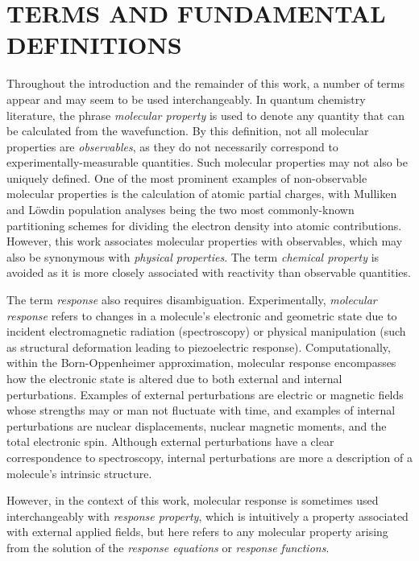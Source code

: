 \documentclass[%
class = book,%
crop = false,%
float = true,%
multi = true,%
preview = false,%
]{standalone}
\let\cite\autocite
\newcommand{\caps}[1]{\uppercase{#1}}
\begin{document}
\section{\texorpdfstring{\caps{Terms and Fundamental Definitions}}{Terms and Fundamental Definitions}}
\label{sec:terms-and-fundamental-definitions}

Throughout the introduction and the remainder of this work, a number of terms appear and may seem to be used interchangeably. In quantum chemistry literature, the phrase \emph{molecular property} is used to denote any quantity that can be calculated from the wavefunction. By this definition, not all molecular properties are \emph{observables}, as they do not necessarily correspond to experimentally-measurable quantities. Such molecular properties may not also be uniquely defined. One of the most prominent examples of non-observable molecular properties is the calculation of atomic partial charges, with Mulliken and L{\"{o}}wdin population analyses being the two most commonly-known partitioning schemes for dividing the electron density into atomic contributions. However, this work associates molecular properties with observables, which may also be synonymous with \emph{physical properties}. The term \emph{chemical property} is avoided as it is more closely associated with reactivity than observable quantities.

The term \emph{response} also requires disambiguation. Experimentally, \emph{molecular response} refers to changes in a molecule's electronic and geometric state due to incident electromagnetic radiation (spectroscopy) or physical manipulation (such as structural deformation leading to piezoelectric response)\cite{doi:10.1021/jz400355v,doi:10.1021/jp412740j,doi:10.1021/acs.jpcb.7b10085}. Computationally, within the Born-Oppenheimer approximation, molecular response encompasses how the electronic state is altered due to both external and internal perturbations. Examples of external perturbations are electric or magnetic fields whose strengths may or man not fluctuate with time, and examples of internal perturbations are nuclear displacements, nuclear magnetic moments, and the total electronic spin. Although external perturbations have a clear correspondence to spectroscopy, internal perturbations are more a description of a molecule's intrinsic structure.

However, in the context of this work, molecular response is sometimes used interchangeably with \emph{response property}, which is intuitively a property associated with external applied fields, but here refers to any molecular property arising from the solution of the \emph{response equations} or \emph{response functions}.
\end{document}
